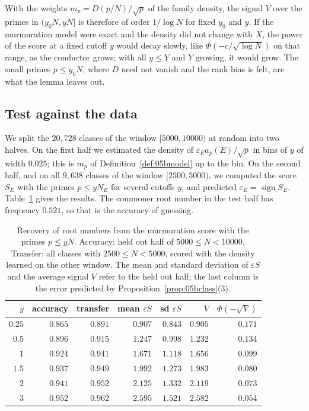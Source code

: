 With the weights $m_p=D(p/N)/\sqrt p$ of the family density, the signal $V$ over the primes in $(y_0N,yN]$ is therefore of order $1/\log N$ for fixed $y_0$ and $y$. If the murmuration model were exact and the density did not change with $X$, the power of the score at a fixed cutoff $y$ would decay slowly, like $\Phi(-c/\sqrt{\log N})$ on that range, as the conductor grows; with all $y\le Y$ and $Y$ growing, it would grow. The small primes $p\le y_0N$, where $D$ need not vanish and the rank bias is felt, are what the lemma leaves out.

\subsection{Test against the data}

We split the $20{,}728$ classes of the window $[5000,10000)$ at random into two halves. On the first half we estimated the density of $\varepsilon_Ea_p(E)/\sqrt p$ in bins of $y$ of width $0.025$; this is $m_p$ of Definition~\ref{def:05bmodel} up to the bin. On the second half, and on all $9{,}638$ classes of the window $[2500,5000)$, we computed the score $S_E$ with the primes $p\le yN_E$ for several cutoffs $y$, and predicted $\varepsilon_E=\operatorname{sign}S_E$. Table~\ref{tab:05bclass} gives the results. The commoner root number in the test half has frequency $0.521$, so that is the accuracy of guessing.

\begin{table}[ht]
\centering
\begin{tabular}{rrrrrrr}
\toprule
$y$ & accuracy & transfer & mean $\varepsilon S$ & sd $\varepsilon S$ & $V$ & $\Phi(-\sqrt V)$ \\
\midrule
$0.25$ & $0.865$ & $0.891$ & $0.907$ & $0.843$ & $0.905$ & $0.171$ \\
$0.5$ & $0.896$ & $0.915$ & $1.247$ & $0.998$ & $1.232$ & $0.134$ \\
$1$ & $0.924$ & $0.941$ & $1.671$ & $1.118$ & $1.656$ & $0.099$ \\
$1.5$ & $0.937$ & $0.949$ & $1.992$ & $1.273$ & $1.983$ & $0.080$ \\
$2$ & $0.941$ & $0.952$ & $2.125$ & $1.332$ & $2.119$ & $0.073$ \\
$3$ & $0.952$ & $0.962$ & $2.595$ & $1.521$ & $2.582$ & $0.054$ \\
\bottomrule
\end{tabular}
\caption{Recovery of root numbers from the murmuration score with the primes $p\le yN$. Accuracy: held out half of $5000\le N<10000$. Transfer: all classes with $2500\le N<5000$, scored with the density learned on the other window. The mean and standard deviation of $\varepsilon S$ and the average signal $V$ refer to the held out half; the last column is the error predicted by Proposition~\ref{prop:05bclass}(3).}\label{tab:05bclass}
\end{table}

